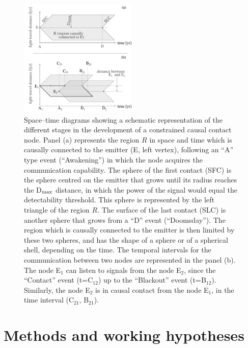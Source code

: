 \documentclass[crop]{CSLB}
\newcommand{\cetis}{nodes}
\begin{document}
\begin{figure}[!t]
   \centering
   \includegraphics[width=0.5\textwidth]{F_scheme.pdf}
   \caption{
Space--time diagrams showing a schematic representation of the different stages
in the development of a constrained causal contact node.
%
Panel (a) represents the region $R$ in space and time which is causally
connected to the emitter (E, left vertex), following an ``A'' type
event (``Awakening'') in which the node acquires the communication
capability.
%
The sphere of the first contact (SFC) is the sphere centred on the emitter that
grows until its radius reaches the D$_{\rm max}$ distance, in which the
power of the signal would equal the detectability threshold.
%
This sphere is represented by the left triangle of the region
$R$.
%
The surface of the last contact (SLC) is another sphere that grows from a ``D''
event (``Doomsday'').
%
The region which is causally connected to the emitter is then limited by these
two spheres, and has the shape of a sphere or of a spherical shell,
depending on the time.
%
The temporal intervals for the communication between two \cetis{} are
represented in the panel (b).
%
The node E$_1$ can listen to signals from the node E$_2$, since
the ``Contact'' event (t=C$_{12}$) up to the ``Blackout'' event
(t=B$_{12}$).
%
Similarly, the node E$_2$ is in causal contact from the
   node E$_1$, in the time interval (C$_{21}$, B$_{21}$).
%
} \label{F_scheme}
%
\end{figure}



\section{Methods and working hypotheses}\label{S_methods}
\end{document}
